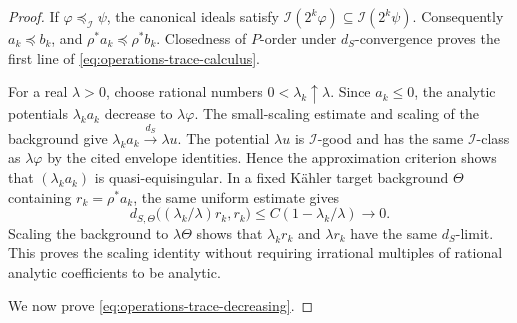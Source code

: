 \begin{proof}
If $\varphi\preceq_{\mathcal I}\psi$, the canonical ideals satisfy
$\mathcal I(2^k\varphi)\subseteq\mathcal I(2^k\psi)$.
Consequently $a_k\preceq b_k$, and
$\rho^*a_k\preceq\rho^*b_k$.
Closedness of $P$-order under $d_S$-convergence
\cite[Proposition~6.2.5]{XiaBook} proves the first line of
\eqref{eq:operations-trace-calculus}.

For a real $\lambda>0$, choose rational numbers
$0<\lambda_k\uparrow\lambda$.
Since $a_k\leq0$, the analytic potentials $\lambda_k a_k$
decrease to $\lambda\varphi$.
The small-scaling estimate and scaling of the background
\cite[Lemmas~6.2.3 and 6.2.6]{XiaBook} give
$\lambda_k a_k\xrightarrow{d_S}\lambda u$.
The potential $\lambda u$ is $\mathcal I$-good and has the same
$\mathcal I$-class as $\lambda\varphi$ by the cited envelope
identities.  Hence the approximation criterion shows that
$(\lambda_k a_k)$ is quasi-equisingular.
In a fixed K\"ahler target background $\Theta$ containing
$r_k=\rho^*a_k$, the same uniform estimate gives
\[
 d_{S,\Theta}\bigl((\lambda_k/\lambda)r_k,r_k\bigr)
 \leq C(1-\lambda_k/\lambda)\longrightarrow0.
\]
Scaling the background to $\lambda\Theta$ shows that
$\lambda_k r_k$ and $\lambda r_k$ have the same $d_S$-limit.
This proves the scaling identity without requiring irrational
multiples of rational analytic coefficients to be analytic.

We now prove \eqref{eq:operations-trace-decreasing}.


\end{proof}
